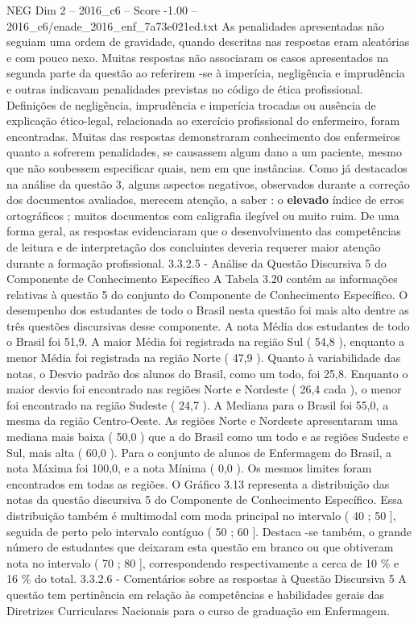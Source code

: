 \begin{textsample}{NEG Dim 2 – 2016\_c6 – Score -1.00 – 2016\_c6/enade\_2016\_enf\_7a73e021ed.txt}
As penalidades apresentadas não seguiam uma ordem de gravidade, quando descritas nas respostas eram aleatórias e com pouco nexo.
Muitas respostas não associaram os casos apresentados na segunda parte da questão ao referirem -se à imperícia, negligência e imprudência e outras indicavam penalidades previstas no código de ética profissional.
Definições de negligência, imprudência e imperícia trocadas ou ausência de explicação ético-legal, relacionada ao exercício profissional do enfermeiro, foram encontradas.
Muitas das respostas demonstraram conhecimento dos enfermeiros quanto a sofrerem penalidades, se causassem algum dano a um paciente, mesmo que não soubessem especificar quais, nem em que instâncias.
Como já destacados na análise da questão 3, alguns aspectos negativos, observados durante a correção dos documentos avaliados, merecem atenção, a saber : o \textbf{elevado} índice de erros ortográficos ; muitos documentos com caligrafia ilegível ou muito ruim.
De uma forma geral, as respostas evidenciaram que o desenvolvimento das competências de leitura e de interpretação dos concluintes deveria requerer maior atenção durante a formação profissional. 3.3.2.5 - Análise da Questão Discursiva 5 do Componente de Conhecimento Específico A Tabela 3.20 contém as informações relativas à questão 5 do conjunto do Componente de Conhecimento Específico.
O desempenho dos estudantes de todo o Brasil nesta questão foi mais alto dentre as três questões discursivas desse componente.
A nota Média dos estudantes de todo o Brasil foi 51,9.
A maior Média foi registrada na região Sul ( 54,8 ), enquanto a menor Média foi registrada na região Norte ( 47,9 ).
Quanto à variabilidade das notas, o Desvio padrão dos alunos do Brasil, como um todo, foi 25,8.
Enquanto o maior desvio foi encontrado nas regiões Norte e Nordeste ( 26,4 cada ), o menor foi encontrado na região Sudeste ( 24,7 ).
A Mediana para o Brasil foi 55,0, a mesma da região Centro-Oeste.
As regiões Norte e Nordeste apresentaram uma mediana mais baixa ( 50,0 ) que a do Brasil como um todo e as regiões Sudeste e Sul, mais alta ( 60,0 ).
Para o conjunto de alunos de Enfermagem do Brasil, a nota Máxima foi 100,0, e a nota Mínima ( 0,0 ).
Os mesmos limites foram encontrados em todas as regiões.
O Gráfico 3.13 representa a distribuição das notas da questão discursiva 5 do Componente de Conhecimento Específico.
Essa distribuição também é multimodal com moda principal no intervalo ( 40 ; 50 ], seguida de perto pelo intervalo contíguo ( 50 ; 60 ].
Destaca -se também, o grande número de estudantes que deixaram esta questão em branco ou que obtiveram nota no intervalo ( 70 ; 80 ], correspondendo respectivamente a cerca de 10 \% e 16 \% do total. 3.3.2.6 - Comentários sobre as respostas à Questão Discursiva 5 A questão tem pertinência em relação às competências e habilidades gerais das Diretrizes Curriculares Nacionais para o curso de graduação em Enfermagem.

\end{textsample}
